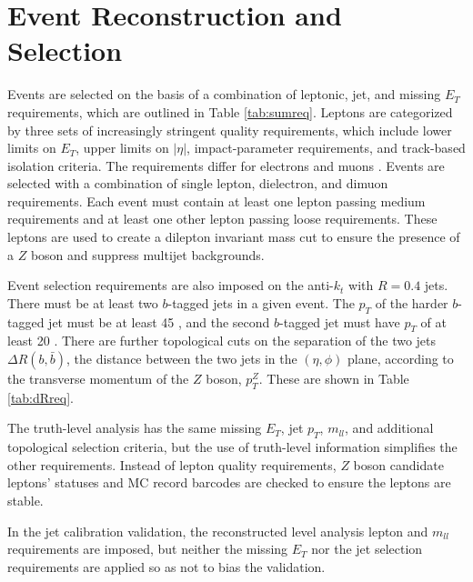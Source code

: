 \section{Event Reconstruction and Selection}
\label{sec:evsel}
Events are selected on the basis of a combination of leptonic, jet, and missing $E_T$ requirements, which are outlined in Table \ref{tab:sumreq}.  Leptons are categorized by three sets of increasingly stringent quality requirements, which include lower limits on $E_T$, upper limits on $\left|\eta\right|$, impact-parameter requirements, and track-based isolation criteria.  The requirements differ for electrons \cite{conf50} and muons \cite{conf51}.  Events are selected with a combination of single lepton, dielectron, and dimuon requirements.  Each event must contain at least one lepton passing medium requirements and at least one other lepton passing loose requirements.  These leptons are used to create a dilepton invariant mass cut to ensure the presence of a $Z$ boson and suppress multijet backgrounds.

Event selection requirements are also imposed on the anti-$k_t$ with $R=0.4$ jets.  There must be at least two $b$-tagged jets in a given event.  The $p_T$ of the harder $b$-tagged jet must be at least 45 \GeV, and the second $b$-tagged jet must have $p_T$ of at least 20 \GeV .  There are further topological cuts on the separation of the two jets $\Delta R\left(b,\bar{b}\right)$, the distance between the two jets in the $\left(\eta,\phi\right)$ plane, according to the transverse momentum of the $Z$ boson, $p_T^Z$.  These are shown in Table \ref{tab:dRreq}.

The truth-level analysis has the same missing $E_T$, jet $p_T$, $m_{ll}$, and additional topological selection criteria, but the use of truth-level information simplifies the other requirements.  Instead of lepton quality requirements, $Z$ boson candidate leptons' statuses and MC record barcodes are checked to ensure the leptons are stable.

In the jet calibration validation, the reconstructed level analysis lepton and $m_{ll}$ requirements are imposed, but neither the missing $E_T$ nor the jet selection requirements are applied so as not to bias the validation.

